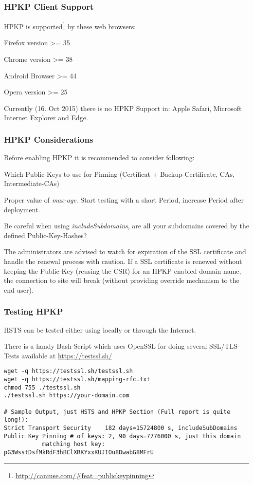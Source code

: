 \subsubsection{HPKP Client Support}
\label{subsubsection:HPKP Client Support}
HPKP is supported\footnote{\url{http://caniuse.com/\#feat=publickeypinning}} by these web browsers:
\begin{itemize*}
  \item Firefox version >= 35
	\item Chrome version >= 38
	\item Android Browser >= 44
	\item Opera version >= 25 
\end{itemize*}
Currently (16. Oct 2015) there is no HPKP Support in: Apple Safari, Microsoft Internet Explorer and Edge.

\subsubsection{HPKP Considerations}
\label{subsubsection:HPKP Considerations}
Before enabling HPKP it is recommended to consider following:
\begin{itemize*}
  \item Which Public-Keys to use for Pinning (Certificat + Backup-Certificate, CAs, Intermediate-CAs)
	\item Proper value of \emph{max-age}. Start testing with a short Period, increase Period after deployment.
	\item Be careful when using \emph{includeSubdomains}, are all your subdomains covered by the defined Public-Key-Hashes?
\end{itemize*}

The administrators are advised to watch for expiration of the SSL certificate and handle the renewal process with caution. If a SSL certificate is renewed without keeping the Public-Key (reusing the CSR) for an HPKP enabled domain name, the connection to site will break (without providing override mechanism to the end user).  

\subsubsection{Testing HPKP}
\label{subsubsection:Testing HPKP}
HSTS can be tested either using locally or through the Internet. 

There is a handy Bash-Script which uses OpenSSL for doing several SSL/TLS-Tests available at \url{https://testssl.sh/}
\begin{lstlisting}
wget -q https://testssl.sh/testssl.sh
wget -q https://testssl.sh/mapping-rfc.txt
chmod 755 ./testssl.sh
./testssl.sh https://your-domain.com

# Sample Output, just HSTS and HPKP Section (Full report is quite long!):
Strict Transport Security    182 days=15724800 s, includeSubDomains
Public Key Pinning # of keys: 2, 90 days=7776000 s, just this domain
           matching host key: pG3WsstDsfMkRdF3hBClXRKYxxKUJIOu8DwabG8MFrU
\end{lstlisting}

